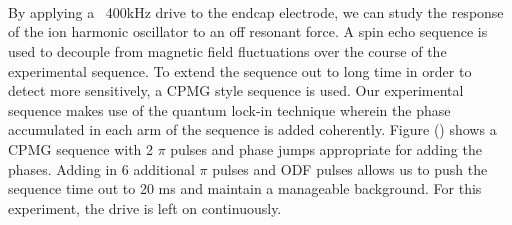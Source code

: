 \documentclass[aps,prl,preprint,groupedaddress]{revtex4-1}
\begin{document}
\begin{figure}
\centering
  \\
  \\
  \hfill
  \\
  \caption{}\label{fig:2}
\end{figure}

By applying a ~400kHz drive to the endcap electrode, we can study the response of the ion harmonic oscillator to an off resonant force. A spin echo sequence is used to decouple from magnetic field fluctuations over the course of the experimental sequence. To extend the sequence out to long time in order to detect more sensitively, a CPMG style sequence is used. Our experimental sequence makes use of the quantum lock-in technique wherein the phase accumulated in each arm of the sequence is added coherently. Figure () shows a CPMG sequence with 2 $\pi$ pulses and phase jumps appropriate for adding the phases. Adding in 6 additional $\pi$ pulses and ODF pulses allows us to push the sequence time out to 20 ms and maintain a manageable background. For this experiment, the drive is left on continuously.
\end{document}

